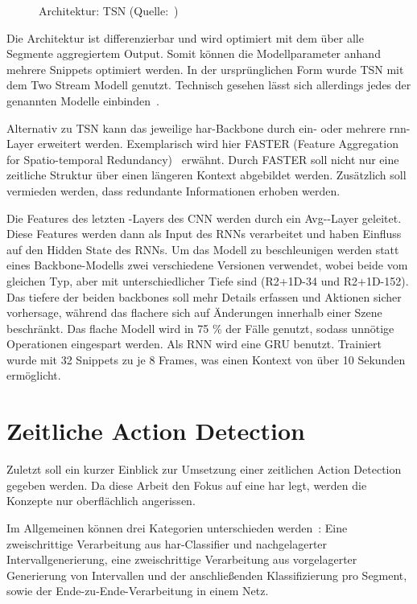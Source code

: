 \begin{figure}[h!]
    \centering
    \caption{Architektur: TSN (Quelle:~\cite{Wang19})}
    \label{fig:tsn}
\end{figure}

Die Architektur ist differenzierbar und wird optimiert mit dem über alle Segmente aggregiertem Output.
Somit können die Modellparameter anhand mehrere Snippets optimiert werden.
In der ursprünglichen Form wurde TSN mit dem Two Stream Modell genutzt.
Technisch gesehen lässt sich allerdings jedes der genannten Modelle einbinden~\cite{Kothawade19}.

Alternativ zu TSN kann das jeweilige \gls{har}-Backbone durch ein- oder mehrere \gls{rnn}-Layer erweitert werden.
Exemplarisch wird hier FASTER (Feature Aggregation for Spatio-temporal Redundancy)~\cite{Zhu19} erwähnt.
Durch FASTER soll nicht nur eine zeitliche Struktur über einen längeren Kontext abgebildet werden.
Zusätzlich soll vermieden werden, dass redundante Informationen erhoben werden.

Die Features des letzten \conv-Layers des CNN werden durch ein Avg-\pool-Layer geleitet.
Diese Features werden dann als Input des RNNs verarbeitet und haben Einfluss auf den Hidden State des RNNs.
Um das Modell zu beschleunigen werden statt eines Backbone-Modells zwei verschiedene Versionen verwendet, wobei beide vom gleichen Typ, aber mit unterschiedlicher Tiefe sind (\zB R2+1D-34 und R2+1D-152).
Das tiefere der beiden backbones soll mehr Details erfassen und Aktionen sicher vorhersage, während das flachere sich auf Änderungen innerhalb einer Szene beschränkt.
Das flache Modell wird in 75 \% der Fälle genutzt, sodass unnötige Operationen eingespart werden.
Als RNN wird eine GRU benutzt.
Trainiert wurde mit 32 Snippets zu je 8 Frames, was einen Kontext von über 10 Sekunden ermöglicht.

\section{Zeitliche Action Detection}
\label{sec:temporal-action-detection}

Zuletzt soll ein kurzer Einblick zur Umsetzung einer zeitlichen Action Detection gegeben werden.
Da diese Arbeit den Fokus auf eine \gls{har} legt, werden die Konzepte nur oberflächlich angerissen.

Im Allgemeinen können drei Kategorien unterschieden werden~\cite{Buch17}:
Eine zweischrittige Verarbeitung aus \gls{har}-Classifier und nachgelagerter Intervallgenerierung, eine zweischrittige Verarbeitung aus vorgelagerter Generierung von Intervallen und der anschließenden Klassifizierung pro Segment, sowie der Ende-zu-Ende-Verarbeitung in einem Netz.


